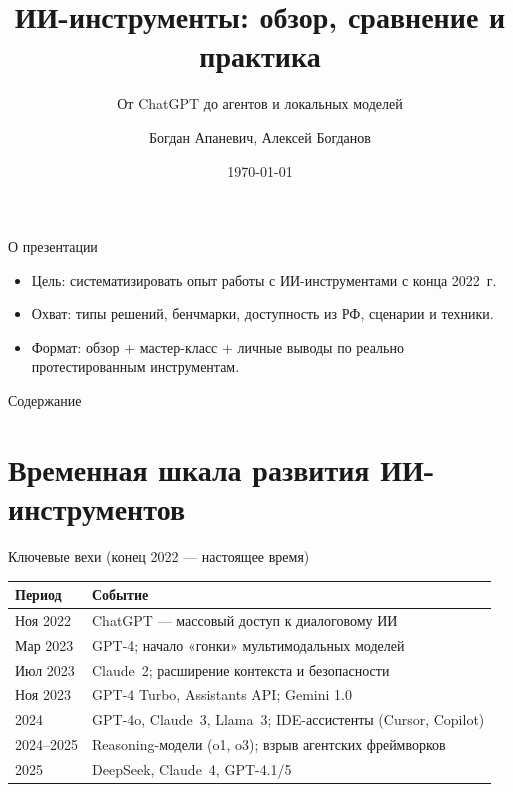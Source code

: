 \documentclass[aspectratio=169,10pt,russian]{beamer}
\title{ИИ-инструменты: обзор, сравнение и практика}
\subtitle{От ChatGPT до агентов и локальных моделей}
\author{Богдан Апаневич, Алексей Богданов}
\institute{ИПА РАН, СПбПУ}
\date{\today}
\begin{document}
\maketitle

\begin{frame}{О презентации}
  \begin{itemize}
    \item Цель: систематизировать опыт работы с ИИ-инструментами с конца 2022~г.
    \item Охват: типы решений, бенчмарки, доступность из РФ, сценарии и техники.
    \item Формат: обзор + мастер-класс + личные выводы по реально протестированным инструментам.
  \end{itemize}
\end{frame}

\begin{frame}{Содержание}
  \tableofcontents
\end{frame}

\section{Временная шкала развития ИИ-инструментов}

\begin{frame}{Ключевые вехи (конец 2022 — настоящее время)}
  \small
  \begin{tabularx}{\linewidth}{@{}l X@{}}
    \toprule
    \textbf{Период} & \textbf{Событие} \\
    \midrule
    Ноя 2022       & ChatGPT — массовый доступ к диалоговому ИИ \\
    Мар 2023       & GPT-4; начало «гонки» мультимодальных моделей \\
    Июл 2023       & Claude~2; расширение контекста и безопасности \\
    Ноя 2023       & GPT-4 Turbo, Assistants API; Gemini 1.0 \\
    2024           & GPT-4o, Claude~3, Llama~3; IDE-ассистенты (Cursor, Copilot) \\
    2024–2025      & Reasoning-модели (o1, o3); взрыв агентских фреймворков \\
    2025           & {DeepSeek, Claude~4, GPT-4.1/5} \\
    \bottomrule
  \end{tabularx}
  \vspace{0.5em}
\end{frame}
\end{document}
